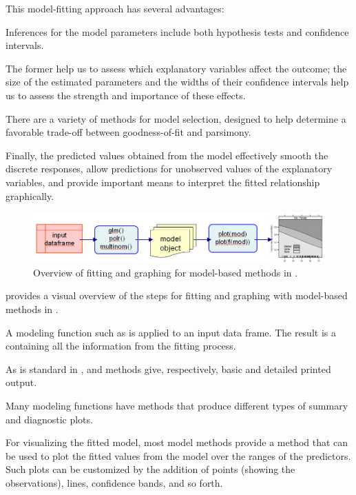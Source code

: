 \documentclass[11pt]{book}\usepackage[]{graphicx}\usepackage[]{color}
\begin{document}
This model-fitting approach has several advantages:
\begin{seriate}
\item Inferences for the model parameters include both hypothesis tests
and confidence intervals.  
\item The former help us to assess which
explanatory variables affect the outcome;  the size of the estimated
parameters and the widths of their confidence intervals help us to
assess the strength and importance of these effects.
\item There are a variety of methods for model selection, designed
to help determine a favorable trade-off between goodness-of-fit
and parsimony.
\item Finally, the predicted values obtained from the model effectively
smooth the discrete responses, allow predictions for unobserved
values of the explanatory variables, and
provide important means to interpret the fitted relationship graphically.
\end{seriate}

\begin{figure}
 \centering
 \includegraphics[width=\textwidth]{ch07/fig/goverview-R1}
 \caption{Overview of fitting and graphing for model-based methods in \R.
 }\label{fig:goverview}
\end{figure}

 provides a visual overview of the steps for fitting and
graphing with model-based methods in \R.  
\begin{seriate}
  \item A modeling function such as
 is applied to an input data frame.  The result is a 
containing all the information from the fitting process.  
  \item As is standard
in \R,  and  methods give, respectively, basic and
detailed printed output. 
  \item Many modeling functions have  methods 
that produce different types of summary and diagnostic plots.  
  \item For visualizing
the fitted model, most model methods provide a  method that can
be used to plot the fitted values from the model over the ranges of the
predictors.  Such plots can be customized by the addition of points 
(showing the observations), lines, confidence bands, and so forth.
\end{seriate}
\end{document}
